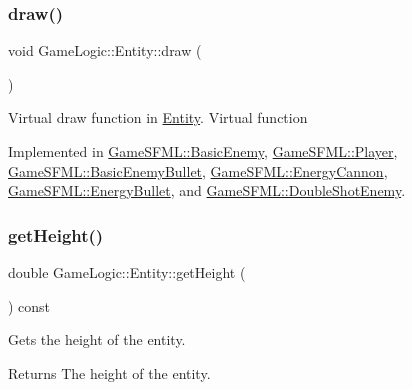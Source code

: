 \subsubsection{\texorpdfstring{draw()}{draw()}}
{\footnotesize\ttfamily void Game\+Logic\+::\+Entity\+::draw (\begin{DoxyParamCaption}{ }\end{DoxyParamCaption})\hspace{0.3cm}{\ttfamily [pure virtual]}}

Virtual draw function in \hyperlink{classGameLogic_1_1Entity}{Entity}. Virtual function 

Implemented in \hyperlink{classGameSFML_1_1BasicEnemy_a1062ddf1321edb7d069b68b396615626}{Game\+S\+F\+M\+L\+::\+Basic\+Enemy}, \hyperlink{classGameSFML_1_1Player_ac694755fafaffdf9432415452c7b9b5b}{Game\+S\+F\+M\+L\+::\+Player}, \hyperlink{classGameSFML_1_1BasicEnemyBullet_af970b7b86c5a21963daac86822a064a2}{Game\+S\+F\+M\+L\+::\+Basic\+Enemy\+Bullet}, \hyperlink{classGameSFML_1_1EnergyCannon_a9c4c44e9ded9422d790c685d5901cb64}{Game\+S\+F\+M\+L\+::\+Energy\+Cannon}, \hyperlink{classGameSFML_1_1EnergyBullet_a41dd2b4aa08fb8af139870c29fa94c00}{Game\+S\+F\+M\+L\+::\+Energy\+Bullet}, and \hyperlink{classGameSFML_1_1DoubleShotEnemy_a3d30aebbab50ad019207d6ba91ab0b5f}{Game\+S\+F\+M\+L\+::\+Double\+Shot\+Enemy}.

\mbox{\label{classGameLogic_1_1Entity_a8d66c2c0153168c3ad9d345327f2c866}} 
\subsubsection{\texorpdfstring{get\+Height()}{getHeight()}}
{\footnotesize\ttfamily double Game\+Logic\+::\+Entity\+::get\+Height (\begin{DoxyParamCaption}{ }\end{DoxyParamCaption}) const}

Gets the height of the entity. \begin{DoxyReturn}{Returns}
The height of the entity. 
\end{DoxyReturn}
\mbox{\label{classGameLogic_1_1Entity_a770b837c07c91f3fa72c755d6d77d153}} 
